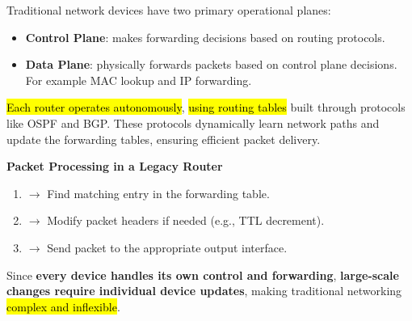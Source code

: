 \noindent
Traditional network devices have two primary operational planes:
\begin{itemize}
    \item \textbf{Control Plane}: makes forwarding decisions based on routing protocols.
    \item \textbf{Data Plane}: physically forwards packets based on control plane decisions. For example MAC lookup and IP forwarding.
\end{itemize}
\hl{Each router operates autonomously}, \hl{using routing tables} built through protocols like OSPF and BGP. These protocols dynamically learn network paths and update the forwarding tables, ensuring efficient packet delivery.

\highspace
\begin{flushleft}
    \textcolor{Green3}{ \textbf{Packet Processing in a Legacy Router}}
\end{flushleft}
\begin{enumerate}
    \item {} $\rightarrow$ Find matching entry in the forwarding table.
    \item {} $\rightarrow$ Modify packet headers if needed (e.g., TTL decrement).
    \item {} $\rightarrow$ Send packet to the appropriate output interface.
\end{enumerate}
\textcolor{Red2}{} Since \textcolor{Red2}{\textbf{every device handles its own control and forwarding}}, \textbf{large-scale changes require individual device updates}, making traditional networking \hl{complex and inflexible}.

